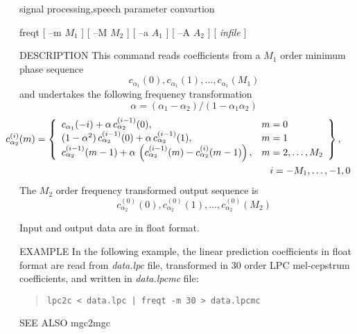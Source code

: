 %
{signal processing,speech parameter convartion}

\begin{synopsis}
\item [freqt] [ --m $M_1$ ] [ --M $M_2$ ] [ --a $A_1$ ] [ --A $A_2$ ]
	      [ {\em infile} ]
\end{synopsis}

\begin{qsection}{DESCRIPTION}
This command reads coefficients from a $M_1$ order minimum phase
sequence
\begin{displaymath}
c_{\alpha_1}(0), c_{\alpha_1}(1), \ldots, c_{\alpha_1}(M_1)
\end{displaymath}
and undertakes the following frequency transformation
\[ \alpha = (\alpha_1 - \alpha_2) / (1 - \alpha_1 \alpha_2) \]
\begin{eqnarray*} 
\hspace{-15mm}&& c_{\alpha_2}^{(i)}(m) = \left\{ 
	\begin{array}{ll}
          c_{\alpha_1}(-i)
	    +\alpha\,c_{\alpha_2}^{(i-1)}(0), &  m=0 \\
          (1-\alpha^2)\,c_{\alpha_2}^{(i-1)}(0)
            +\alpha\,c_{\alpha_2}^{(i-1)}(1), &  m=1 \\
          c_{\alpha_2}^{(i-1)}(m-1) 
	    +\alpha\, \left(c_{\alpha_2}^{(i-1)}(m)
	    -c_{\alpha_2}^{(i)}(m-1)\right), &   m=2,\ldots,M_2
         \end{array} \right\}, \quad \nonumber \\
\hspace{-15mm}&& \hspace{80mm} i = -M_1,\ldots,-1,0 
\end{eqnarray*}
The $M_2$ order frequency transformed output sequence is
\begin{displaymath}
c_{\alpha_2}^{(0)}(0), c_{\alpha_2}^{(0)}(1), \ldots, c_{\alpha_2}^{(0)}(M_2)
\end{displaymath}
\par
Input and output data are in float format.
\end{qsection}

\begin{options}
\end{options}

\begin{qsection}{EXAMPLE}
In the following example, the linear prediction coefficients in
float format are read from {\em data.lpc} file, 
transformed in 30 order LPC mel-cepstrum coefficients,
and written in {\em data.lpcmc} file:
\begin{quote}
 \verb!lpc2c < data.lpc | freqt -m 30 > data.lpcmc!
\end{quote} 
\end{qsection}

\begin{qsection}{SEE ALSO}
mgc2mgc
\end{qsection}
